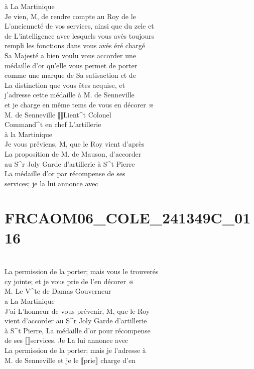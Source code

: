 \documentclass{article}
\begin{document}
\begin{pages}
à La Martinique\\
Je vien, M, de rendre compte au Roy de le\\
L'ancienneté de vos services, ainsi que du zele et\\
de L'intelligence avec lesquels vous avés toujours\\
rempli les fonctions dans vous avés éré chargé\\
Sa Majesté a bien voulu vous accorder une\\
médaille d'or qu'elle vous permet de porter\\
comme une marque de Sa satisaction et de\\
La distinction que vous êtes acquise, et\\
j'adresse cette médaille à M. de Senneville\\
et je charge en même tems de vous en décorer ※\\
M. de Senneville ⟦⟧Lient\^{}t Colonel\\
Command\^{}t en chef L'artillerie\\
à la Martinique\\
Je vous préviens, M, que le Roy vient d'après\\
La proposition de M. de Mauson, d'accorder\\
au S\^{}r Joly Garde d'artillerie à S\^{}t Pierre\\
La médaille d'or par récompense de ses\\
services; je la lui annonce avec
\pend
\endnumbering\beginnumbering\section{FRCAOM06\_COLE\_241349C\_0116}\pstart
\\
La permission de la porter; mais vous le trouverés\\
cy jointe; et je vous prie de l'en décorer ※\\
M. Le V\^{}te de Damas Gouverneur\\
a La Martinique\\
J'ai L'honneur de vous prévenir, M, que le Roy\\
vient d'accorder au S\^{}r Joly Garde d'artillerie\\
à S\^{}t Pierre, La médaille d'or pour récompense\\
de ses ⟦⟧services. Je La lui annonce avec\\
La permission de la porter; mais je l'adresse à\\
M. de Senneville et je le ⟦prie⟧ charge d'en\\

\end{pages}
\end{document}
